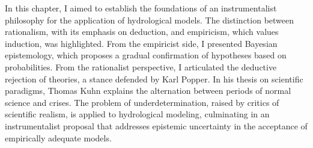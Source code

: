 \documentclass[./main_en.tex]{subfiles}
\begin{document}
\par In this chapter, I aimed to establish the foundations of an instrumentalist philosophy for the application of hydrological models. The distinction between rationalism, with its emphasis on deduction, and empiricism, which values induction, was highlighted. From the empiricist side, I presented Bayesian epistemology, which proposes a gradual confirmation of hypotheses based on probabilities. From the rationalist perspective, I articulated the deductive rejection of theories, a stance defended by Karl Popper. In his thesis on scientific paradigms, Thomas Kuhn explains the alternation between periods of normal science and crises. The problem of underdetermination, raised by critics of scientific realism, is applied to hydrological modeling, culminating in an instrumentalist proposal that addresses epistemic uncertainty in the acceptance of empirically adequate models.
\end{document}

